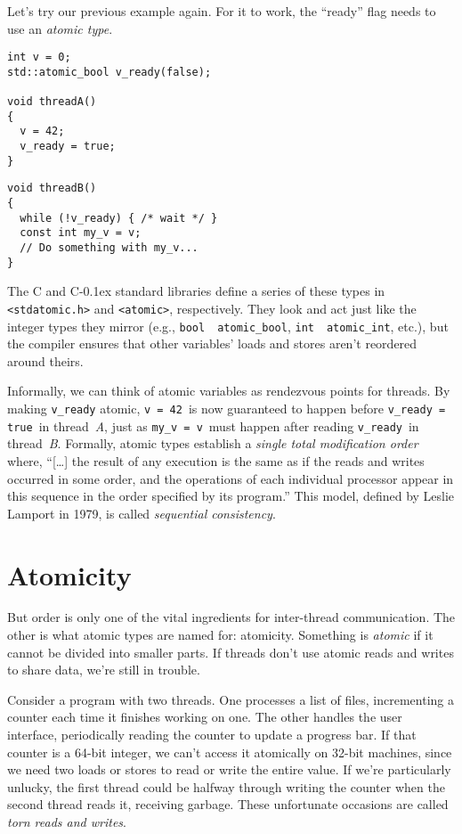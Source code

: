 \documentclass[fontsize=\bodyfontsize, numbers=endperiod]{scrartcl}
\newcommand{\codesize}{\fontsize{\bodyfontsize}{\bodybaselineskip}}
\newcommand{\monobox}[1]{\mbox{\texttt{#1}}}
\newcommand{\cpp}[1]{C\kern-0.1ex\raisebox{0.15ex}{\texttt{++}}{\addfontfeature{Numbers=LowercaseOff}#1}}
\newcommand{\introduce}[1]{\textit{#1}}
\newenvironment{colfigure}
  {\par\vspace{1\baselineskip minus 0.5\baselineskip}\noindent\minipage{\linewidth}}
  {\endminipage\vspace{1\baselineskip minus 0.7\baselineskip}}
\begin{document}
\begin{multicols}{2}
Let's try our previous example again.
For it to work, the ``ready'' flag needs to use an \introduce{atomic type}.
\begin{colfigure}
\begin{verbatim}
int v = 0;
std::atomic_bool v_ready(false);

void threadA()
{
  v = 42;
  v_ready = true;
}
\end{verbatim}
\end{colfigure}
\begin{colfigure}
\begin{verbatim}
void threadB()
{
  while (!v_ready) { /* wait */ }
  const int my_v = v;
  // Do something with my_v...
}
\end{verbatim}
\end{colfigure}
The C and \cpp{} standard libraries define a series of these types
in \texttt{<stdatomic.h>} and \texttt{<atomic>}, respectively.
They look and act just like the integer types they mirror
(e.g., \monobox{bool}~\textrightarrow~\monobox{atomic\_bool},
\monobox{int}~\textrightarrow~\monobox{atomic\_int}, etc.),
but the compiler ensures that other variables' loads and stores aren't
reordered around theirs.

Informally, we can think of atomic variables
as rendezvous points for threads.
By making \monobox{v\_ready} atomic,
\monobox{v = 42}\, is now guaranteed to happen before
\monobox{v\_ready = true}\, in thread~\textit{A},
just as \monobox{my\_v = v}\, must happen after reading \monobox{v\_ready}\,
in thread~\textit{B}.
Formally, atomic types establish a \textit{single total modification order}
where,
``[\ldots] the result of any execution is the same as if the reads and writes
occurred in some order, and the operations of each individual
processor appear in this sequence in the order specified by its program.''
This model, defined by Leslie Lamport in 1979,
is called \introduce{sequential consistency}.

\section{Atomicity}
\label{atomicity}
But order is only one of the vital ingredients for inter-thread communication.
The other is what atomic types are named for: atomicity.
Something is \introduce{atomic} if it cannot be divided into smaller parts.
If threads don't use atomic reads and writes to share data, we're still in trouble.

Consider a program with two threads.
One processes a list of files,
incrementing a counter each time it finishes working on one.
The other handles the user interface, periodically reading
the counter to update a progress bar.
If that counter is a 64-bit integer, we can't access it atomically on 32-bit
machines, since we need two loads or stores to read or write the entire value.
If we're particularly unlucky,
the first thread could be halfway through writing the counter
when the second thread reads it, receiving garbage.
These unfortunate occasions are called \introduce{torn reads and writes}.


\end{multicols}
\end{document}
